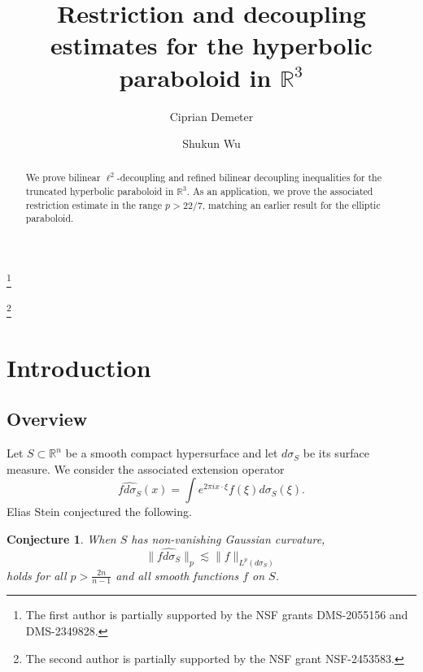 \documentclass{amsart}%
\numberwithin{equation}{section}
\newtheorem{conjecture}[theorem]{Conjecture}
\newcommand{\si}{\sigma}
\newcommand{\wh}{\widehat}
\newcommand{\ZR}{\mathbb{R}}
\newcommand{\R}{\mathbb{R}}
\newcommand{\1}{\mathbbm{1}}
\begin{document}
\title[Restriction and decoupling estimates]{Restriction and decoupling estimates for the hyperbolic paraboloid in $\R^3$}



\author{Ciprian Demeter} \address{ Ciprian Demeter\\  Department of Mathematics\\ Indiana University Bloomington, USA} 

\author{Shukun Wu} \address{ Shukun Wu\\  Department of Mathematics\\ Indiana University Bloomington, USA} 

\thanks{The first author is partially supported by the NSF grants DMS-2055156 and  DMS-2349828.}

\thanks{The second author is partially supported by the NSF grant NSF-2453583.}

\begin{abstract}
We prove bilinear $\ell^2$-decoupling and refined bilinear decoupling inequalities for the  truncated hyperbolic paraboloid in $\R^3$.
As an application, we prove the associated restriction estimate in the range $p>22/7$, matching an earlier result for the elliptic paraboloid.

\end{abstract}

\maketitle


\section{Introduction}


\subsection{Overview} Let $S\subset\ZR^n$ be a smooth compact hypersurface and let $d\si_S$ be its surface measure.
We consider the associated extension operator 
\begin{equation}
\nonumber
    \wh{fd\si_S}(x)=\int e^{2\pi ix\cdot \xi}f(\xi)d\si_S(\xi).
\end{equation}
Elias Stein conjectured the following.

\begin{conjecture}
\label{restriction-conj}
When $S$ has non-vanishing Gaussian curvature, 
\begin{equation}
\label{restriction-esti-1}
    \|\wh{fd\si_S}\|_{p}\lesssim \|f\|_{L^p(d\si_S)}
\end{equation}
holds for all $p>\frac{2n}{n-1}$ and all smooth functions $f$ on $S$.
\end{conjecture}
\end{document}
